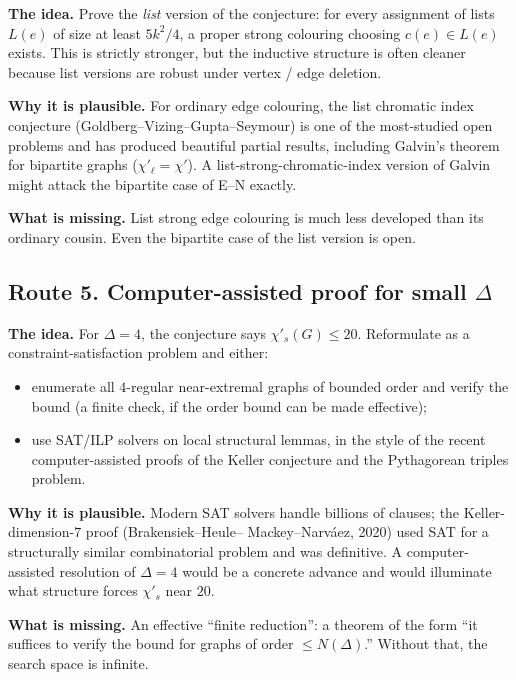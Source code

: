 \documentclass[11pt]{article}
\newcommand{\sci}{\chi'_s}
\begin{document}
\textbf{The idea.} Prove the \emph{list} version of the conjecture:
for every assignment of lists $L(e)$ of size at least $5k^2/4$, a
proper strong colouring choosing $c(e) \in L(e)$ exists. This is
strictly stronger, but the inductive structure is often cleaner
because list versions are robust under vertex / edge deletion.

\textbf{Why it is plausible.} For ordinary edge colouring, the list
chromatic index conjecture (Goldberg--Vizing--Gupta--Seymour) is one
of the most-studied open problems and has produced beautiful
partial results, including Galvin's theorem for bipartite graphs
($\chi'_\ell = \chi'$). A list-strong-chromatic-index version of
Galvin might attack the bipartite case of E--N exactly.

\textbf{What is missing.} List strong edge colouring is much less
developed than its ordinary cousin. Even the bipartite case of the
list version is open.

\subsection*{Route 5. Computer-assisted proof for small $\Delta$}

\textbf{The idea.} For $\Delta = 4$, the conjecture says
$\sci(G) \leq 20$. Reformulate as a constraint-satisfaction problem
and either:

\begin{itemize}[leftmargin=*, itemsep=2pt]
  \item enumerate all $4$-regular near-extremal graphs of bounded
        order and verify the bound (a finite check, if the order
        bound can be made effective);
  \item use SAT/ILP solvers on local structural lemmas, in the style
        of the recent computer-assisted proofs of the
        Keller conjecture and the Pythagorean triples problem.
\end{itemize}

\textbf{Why it is plausible.} Modern SAT solvers handle billions of
clauses; the Keller-dimension-$7$ proof (Brakensiek--Heule--
Mackey--Narv\'aez, 2020) used SAT for a structurally similar
combinatorial problem and was definitive. A computer-assisted
resolution of $\Delta = 4$ would be a concrete advance and would
illuminate what structure forces $\sci$ near $20$.

\textbf{What is missing.} An effective ``finite reduction'': a
theorem of the form ``it suffices to verify the bound for graphs of
order $\leq N(\Delta)$.''  Without that, the search space is
infinite.
\end{document}
